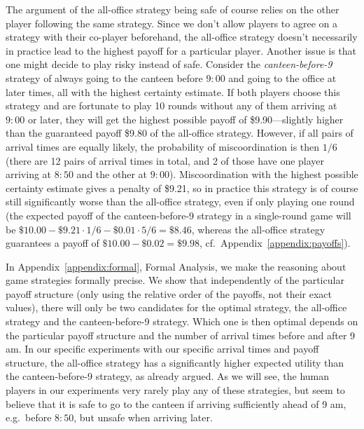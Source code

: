 \documentclass[twocolumn,a4paper,superscriptaddress,nofootinbib]{revtex4}
\newcommand{\tobo}[1]{{\color{red} TOBO: #1}}
\newcommand{\tsn}[1]{{\color{blue} TSN: #1}}
\begin{document}
The argument of the all-office strategy being safe of course relies on the other player following the same strategy. Since we don't allow players to agree on a strategy with their co-player beforehand, the all-office strategy doesn't necessarily in practice lead to the highest payoff for a particular player. Another issue is that one might decide to play risky instead of safe. Consider the \emph{canteen-before-9} strategy of always going to the canteen before $9{:}00$ and going to the office at later times, all with the highest certainty estimate. If both players choose this strategy and are fortunate to play 10 rounds without any of them arriving  at $9{:}00$ or later, they will get the highest possible payoff of \$9.90---slightly higher than the guaranteed payoff \$9.80 of the all-office strategy. However, if all pairs of arrival times are equally likely, the probability of miscoordination is then $1/6$ (there are 12 pairs of arrival times in total, and 2 of those have one player arriving at $8{:}50$ and the other at $9{:}00$). Miscoordination with the highest possible certainty estimate gives a penalty of \$9.21, so in practice this strategy is of course still significantly worse than the all-office strategy, even if only playing one round (the expected payoff of the canteen-before-9 strategy in a single-round game will be $\$10.00 - \$9.21\cdot 1/6 - \$0.01\cdot 5/6 = \$8.46$, whereas the all-office strategy guarantees a payoff of $\$10.00-\$0.02 = \$9.98$, cf.\ Appendix~\ref{appendix:payoffs}).

In Appendix~\ref{appendix:formal}, Formal Analysis, 
we make the reasoning about game strategies formally precise. We show that independently of the particular payoff structure (only using the relative order of the payoffs, not their exact values), there will only be two candidates for the optimal strategy, the all-office strategy and the canteen-before-9 strategy. Which one is then optimal depends on the particular payoff structure and the number of arrival times before and after 9 am. In our specific experiments with our specific arrival times and payoff structure, the all-office strategy has a significantly higher expected utility than the canteen-before-9 strategy, as already argued. As we will see, the human players in our experiments very rarely play any of these strategies, but seem to believe that it is safe to go to the canteen if arriving sufficiently ahead of 9 am, e.g.\ before $8{:}50$, but unsafe when arriving later.
\end{document}
